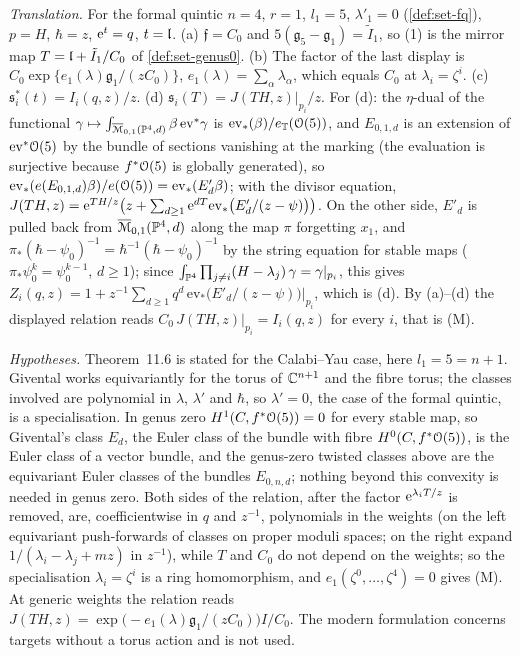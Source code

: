 \emph{Translation.} For the formal quintic $n=4$, $r=1$, $l_1=5$, $\lambda'_1=0$ (\cref{def:set-fq}), $p=H$, $\hbar=z$, $\mathrm{e}^t=q$, $t=\mathfrak{l}$. (a) $\mathfrak f=C_0$ and $5(\mathfrak g_5-\mathfrak g_1)=\tilde I_1$, so (1) is the mirror map $T=\mathfrak{l}+\tilde I_1/C_0$ of \cref{def:set-genus0}. (b) The factor of the last display is $C_0\exp\{e_1(\lambda)\mathfrak g_1/(zC_0)\}$, $e_1(\lambda)=\sum_\alpha\lambda_\alpha$, which equals $C_0$ at $\lambda_i=\zeta^i$. (c) $\mathfrak s_i^*(t)=I_i(q,z)/z$. (d) $\mathfrak s_i(T)=J(TH,z)|_{p_i}/z$. For (d): the $\eta$-dual of the functional $\gamma\mapsto\int_{\overline{\mathcal M}_{0,1}(\mathbb{P}^4,d)}\beta\,\mathrm{ev}^*\gamma$ is $\mathrm{ev}_*(\beta)/e_{\mathbb{T}}(\mathcal{O}(5))$, and $E_{0,1,d}$ is an extension of $\mathrm{ev}^*\mathcal{O}(5)$ by the bundle of sections vanishing at the marking (the evaluation is surjective because $f^*\mathcal{O}(5)$ is globally generated), so $\mathrm{ev}_*(e(E_{0,1,d})\beta)/e(\mathcal{O}(5))=\mathrm{ev}_*(E'_d\beta)$; with the divisor equation, $J(TH,z)=\mathrm{e}^{TH/z}\bigl(z+\sum_{d\geq1}\mathrm{e}^{dT}\mathrm{ev}_*\bigl(E'_d/(z-\psi)\bigr)\bigr)$. On the other side, $E'_d$ is pulled back from $\overline{\mathcal M}_{0,1}(\mathbb{P}^4,d)$ along the map $\pi$ forgetting $x_1$, and $\pi_*(\hbar-\psi_0)^{-1}=\hbar^{-1}(\hbar-\psi_0)^{-1}$ by the string equation for stable maps ($\pi_*\psi_0^k=\psi_0^{k-1}$, $d\geq1$); since $\int_{\mathbb{P}^4}\prod_{j\neq i}(H-\lambda_j)\,\gamma=\gamma|_{p_i}$, this gives $Z_i(q,z)=1+z^{-1}\sum_{d\geq1}q^d\,\mathrm{ev}_*\bigl(E'_d/(z-\psi)\bigr)|_{p_i}$, which is (d). By (a)--(d) the displayed relation reads $C_0\,J(TH,z)|_{p_i}=I_i(q,z)$ for every $i$, that is (M).

\emph{Hypotheses.} Theorem~11.6 is stated for the Calabi--Yau case, here $l_1=5=n+1$. Givental works equivariantly for the torus of $\mathbb{C}^{n+1}$ and the fibre torus; the classes involved are polynomial in $\lambda$, $\lambda'$ and $\hbar$, so $\lambda'=0$, the case of the formal quintic, is a specialisation. In genus zero $H^1(C,f^*\mathcal{O}(5))=0$ for every stable map, so Givental's class $E_d$, the Euler class of the bundle with fibre $H^0(C,f^*\mathcal{O}(5))$, is the Euler class of a vector bundle, and the genus-zero twisted classes above are the equivariant Euler classes of the bundles $E_{0,n,d}$; nothing beyond this convexity is needed in genus zero. Both sides of the relation, after the factor $\mathrm{e}^{\lambda_iT/z}$ is removed, are, coefficientwise in $q$ and $z^{-1}$, polynomials in the weights (on the left equivariant push-forwards of classes on proper moduli spaces; on the right expand $1/(\lambda_i-\lambda_j+mz)$ in $z^{-1}$), while $T$ and $C_0$ do not depend on the weights; so the specialisation $\lambda_i=\zeta^i$ is a ring homomorphism, and $e_1(\zeta^0,\dots,\zeta^4)=0$ gives (M). At generic weights the relation reads $J(TH,z)=\exp\bigl(-e_1(\lambda)\mathfrak g_1/(zC_0)\bigr)I/C_0$. The modern formulation \cite[Theorem~2]{MR2276766} concerns targets without a torus action and is not used.

